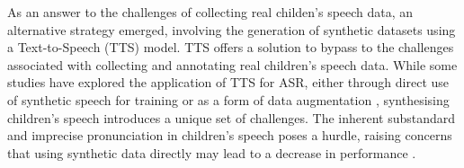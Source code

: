 As an answer to the challenges of collecting real childen's speech data, an alternative strategy emerged, involving the generation of synthetic datasets using a Text-to-Speech (TTS) model. TTS offers a solution to bypass to the challenges associated with collecting and annotating real children's speech data. While some studies have explored the application of TTS for ASR, either through direct use of synthetic speech for training or as a form of data augmentation \cite{laptev2020you,fazel21_interspeech}, synthesising children's speech introduces a unique set of challenges. The inherent substandard and imprecise pronunciation in children's speech \cite{wang2021towards} poses a hurdle, raising concerns that using synthetic data directly may lead to a decrease in performance \cite{wang2021towards, hu2022synt++}.

